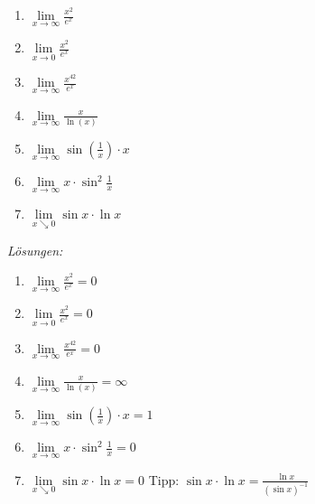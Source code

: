 \begin{ueb}
{}{}
\begin{enumerate}
     \item $\lim\limits_{x \to \infty} \frac{x^2}{e^x}$
    \item $\lim\limits_{x \to 0} \frac{x^{2}}{e^x}$
     \item $\lim\limits_{x \to \infty} \frac{x^{42}}{e^x}$
     \item $\lim\limits_{x \to \infty} \frac{x}{\ln(x)}$
     \item $\lim\limits_{x \to \infty} \sin\left(\frac{1}{x}\right) \cdot x$
     
         \item $\lim\limits_{x \to \infty} x \cdot \sin^2 \frac{1}{x}$
         \item $\lim\limits_{x \searrow 0} \sin x \cdot \ln x$

\end{enumerate}
\end{ueb}
\clearpage
\emph{Lösungen:}
\begin{enumerate}
    \item $\lim\limits_{x \to \infty} \frac{x^2}{e^x} = 0$
   \item $\lim\limits_{x \to 0} \frac{x^{2}}{e^x} = 0$
    \item $\lim\limits_{x \to \infty} \frac{x^{42}}{e^x} = 0$
   
    \item $\lim\limits_{x \to \infty} \frac{x}{\ln(x)} = \infty$
    \item $\lim\limits_{x \to \infty} \sin\left(\frac{1}{x}\right) \cdot x = 1$
    
        \item $\lim\limits_{x \to \infty} x \cdot \sin^2 \frac{1}{x} = 0$
        \item $\lim\limits_{x \searrow 0} \sin x \cdot \ln x = 0$ Tipp: $\sin x \cdot \ln x = \frac{\ln x}{(\sin x)^{-1}}$

\end{enumerate}




